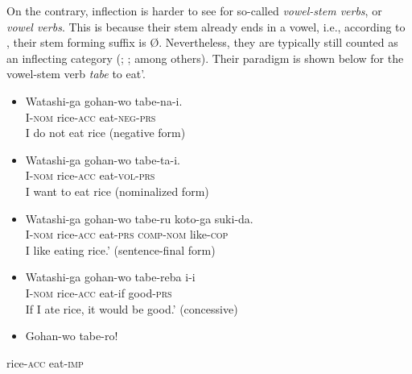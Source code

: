 \documentclass[output=paper]{langscibook}
\begin{document}
On the contrary, inflection is harder to see for so-called \textit{vowel-stem verbs}, or \textit{vowel verbs}. This is because their stem already ends in a vowel, i.e., according to \citet[80]{Ishizuka2013}, their stem forming suffix is Ø. Nevertheless, they are typically still counted as an inflecting category (\citealt{Shibatani1990}; \citealt{Uehara1998}; \citealt{Ishizuka2013} among others). Their paradigm is shown below for the vowel-stem verb \textit{tabe} {\textasciigrave}to eat’.

\begin{itemize}
\item \begin{styleBeispielCinqueKapitel}
Watashi-ga gohan-wo tabe-na-i.\\
I-\textsc{nom} rice-\textsc{acc} eat-\textsc{neg}{}-\textsc{prs}\\
{\textasciigrave}I do not eat rice       (negative form)
\end{styleBeispielCinqueKapitel}
\item \begin{styleBeispielCinqueKapitel}
Watashi-ga gohan-wo tabe-ta-i.\\
I-\textsc{nom} rice-\textsc{acc} eat-\textsc{vol}{}-\textsc{prs}\\
{\textasciigrave}I want to eat rice     (nominalized form)
\end{styleBeispielCinqueKapitel}
\item \begin{styleBeispielCinqueKapitel}
Watashi-ga gohan-wo tabe-ru koto-ga suki-da.\\
I-\textsc{nom} rice-\textsc{acc} eat-\textsc{prs} \textsc{comp}{}-\textsc{nom} like-\textsc{cop}\\
{\textasciigrave}I like eating rice.’     (sentence-final form)
\end{styleBeispielCinqueKapitel}
\item \begin{styleBeispielCinqueKapitel}
Watashi-ga gohan-wo tabe-reba i-i\\
I-\textsc{nom} rice-\textsc{acc} eat-if good-\textsc{prs}\\
{\textasciigrave}If I ate rice, it would be good.’   (concessive)
\end{styleBeispielCinqueKapitel}
\item \begin{styleBeispielCinqueKapitel}
Gohan-wo tabe-ro!
\end{styleBeispielCinqueKapitel}
\end{itemize}
\begin{styleBeispielCinqueKapitel}
rice-\textsc{acc} eat-\textsc{imp}
\end{styleBeispielCinqueKapitel}
\end{document}
